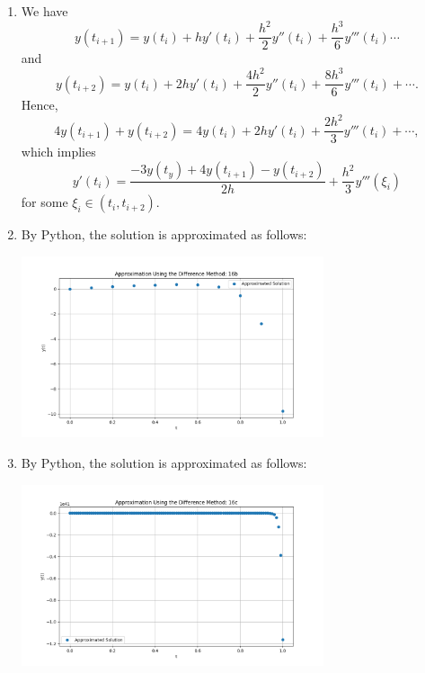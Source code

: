 \documentclass[11pt]{article}
\theoremstyle{break}
\numberwithin{equation}{theorem}
\begin{document}
\begin{enumerate}
    \item We have \begin{equation*}
        y(t_{i+1})=y(t_i)+hy'(t_i)+\dfrac{h^2}{2}y''(t_i)+\dfrac{h^3}{6}y'''(t_i)\cdots
    \end{equation*}
    and \begin{equation*}
        y(t_{i+2})=y(t_i)+2hy'(t_i)+\dfrac{4h^2}{2}y''(t_i)+\dfrac{8h^3}{6}y'''(t_i)+\cdots.
    \end{equation*} Hence, \begin{equation*}
        4y(t_{i+1})+y(t_{i+2})=4y(t_i)+2hy'(t_i)+\dfrac{2h^2}{3}y'''(t_i)+\cdots,
    \end{equation*}
    which implies \begin{equation*}
        y'(t_i)=\dfrac{-3y(t_y)+4y(t_{i+1})-y(t_{i+2})}{2h}+\dfrac{h^2}{3}y'''(\xi_i)
    \end{equation*}
    for some $\xi_i\in(t_i, t_{i+2})$.
    \item By Python, the solution is approximated as follows:
    \begin{center}
        \includegraphics[width=0.7\textwidth]{P16b.png}
    \end{center}
    \item By Python, the solution is approximated as follows:
    \begin{center}
        \includegraphics[width=0.7\textwidth]{P16c.png}

\end{center}
\end{enumerate}
\end{document}
